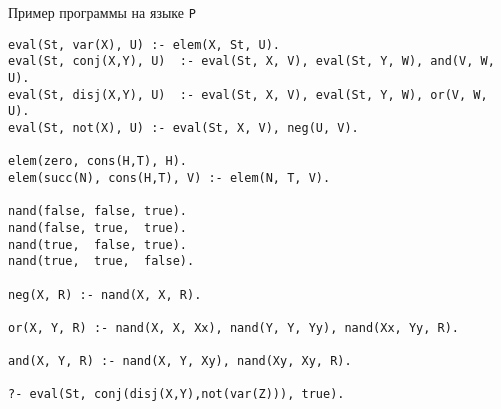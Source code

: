 \documentclass[12pt]{article}
\begin{document}
\begin{center}
    \Large{Пример программы на языке \verb!P!}
\end{center}

\begin{verbatim}
eval(St, var(X), U) :- elem(X, St, U).
eval(St, conj(X,Y), U)  :- eval(St, X, V), eval(St, Y, W), and(V, W, U).
eval(St, disj(X,Y), U)  :- eval(St, X, V), eval(St, Y, W), or(V, W, U).
eval(St, not(X), U) :- eval(St, X, V), neg(U, V).

elem(zero, cons(H,T), H).
elem(succ(N), cons(H,T), V) :- elem(N, T, V).

nand(false, false, true).
nand(false, true,  true).
nand(true,  false, true).
nand(true,  true,  false).

neg(X, R) :- nand(X, X, R).

or(X, Y, R) :- nand(X, X, Xx), nand(Y, Y, Yy), nand(Xx, Yy, R).

and(X, Y, R) :- nand(X, Y, Xy), nand(Xy, Xy, R).

?- eval(St, conj(disj(X,Y),not(var(Z))), true).
\end{verbatim}
\end{document}
